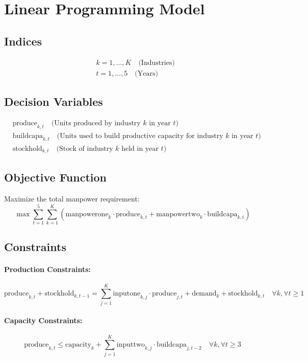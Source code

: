 \documentclass{article}
\begin{document}
\section*{Linear Programming Model}

\subsection*{Indices}
\begin{align*}
& k = 1, \ldots, K \quad \text{(Industries)} \\
& t = 1, \ldots, 5 \quad \text{(Years)}
\end{align*}

\subsection*{Decision Variables}
\begin{align*}
& \text{produce}_{k,t} \quad \text{(Units produced by industry $k$ in year $t$)} \\
& \text{buildcapa}_{k,t} \quad \text{(Units used to build productive capacity for industry $k$ in year $t$)} \\
& \text{stockhold}_{k,t} \quad \text{(Stock of industry $k$ held in year $t$)}
\end{align*}

\subsection*{Objective Function}
Maximize the total manpower requirement:
\[
\max \sum_{t=1}^{5} \sum_{k=1}^{K} \left( \text{manpowerone}_{k} \cdot \text{produce}_{k,t} + \text{manpowertwo}_{k} \cdot \text{buildcapa}_{k,t} \right)
\]

\subsection*{Constraints}

\paragraph{Production Constraints:}
\[
\text{produce}_{k,t} + \text{stockhold}_{k,t-1} = \sum_{j=1}^{K} \text{inputone}_{k,j} \cdot \text{produce}_{j,t} + \text{demand}_{k} + \text{stockhold}_{k,t} \quad \forall k, \forall t \geq 1
\]

\paragraph{Capacity Constraints:}
\[
\text{produce}_{k,t} \leq \text{capacity}_{k} + \sum_{j=1}^{K} \text{inputtwo}_{k,j} \cdot \text{buildcapa}_{j,t-2} \quad \forall k, \forall t \geq 3
\]
\end{document}
